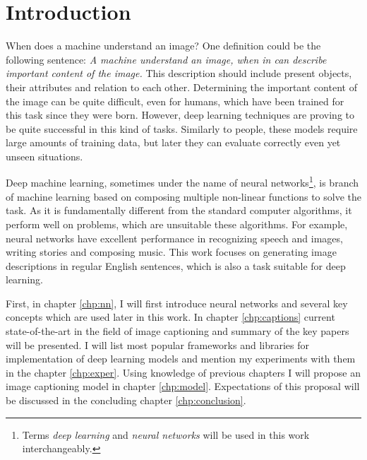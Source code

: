 
\chapter{Introduction}


When does a machine understand an image? One definition could be the following sentence: \emph{A machine understand an image, when in can describe important content of the image.} This description should include present objects, their attributes and relation to each other. Determining the important content of the image can be quite difficult, even for humans, which have been trained for this task since they were born. However, deep learning techniques are proving to be quite successful in this kind of tasks. Similarly to people, these models require large amounts of training data, but later they can evaluate correctly even yet unseen situations.

Deep machine learning, sometimes under the name of neural networks\footnote{Terms \emph{deep learning} and \emph{neural networks} will be used in this work interchangeably.}, is branch of machine learning based on composing multiple non-linear functions to solve the task. As it is fundamentally different from the standard computer algorithms, it perform well on problems, which are unsuitable these algorithms. For example, neural networks have excellent performance in recognizing speech and images, writing stories and composing music. This work focuses on generating image descriptions in regular English sentences, which is also a task suitable for deep learning.

First, in chapter \ref{chp:nn}, I will first introduce neural networks and several key concepts which are used later in this work. In chapter \ref{chp:captions} current state-of-the-art in the field of image captioning and summary of the key papers will be presented. I will list most popular frameworks and libraries for implementation of deep learning models and mention my experiments with them in the chapter \ref{chp:exper}. Using knowledge of previous chapters I will propose an image captioning model in chapter \ref{chp:model}. Expectations of this proposal will be discussed in the concluding chapter \ref{chp:conclusion}.



